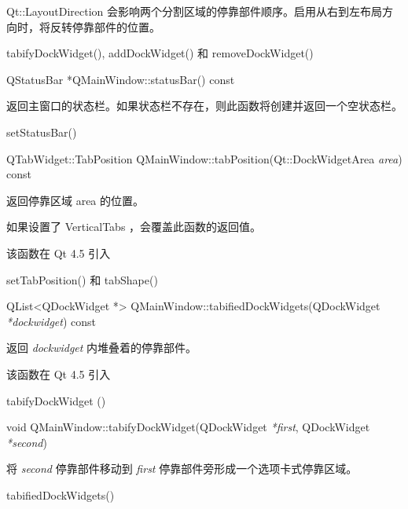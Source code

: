 \begin{notice}
Qt::LayoutDirection 会影响两个分割区域的停靠部件顺序。启用从右到左布局方向时，将反转停靠部件的位置。
\end{notice}


\begin{seeAlso}
tabifyDockWidget(), addDockWidget() 和 removeDockWidget()
\end{seeAlso}

\splitLine

QStatusBar *QMainWindow::statusBar() const

返回主窗口的状态栏。如果状态栏不存在，则此函数将创建并返回一个空状态栏。

\begin{seeAlso}
setStatusBar()
\end{seeAlso}

\splitLine

QTabWidget::TabPosition QMainWindow::tabPosition(Qt::DockWidgetArea \emph{area}) const

返回停靠区域 area 的位置。

\begin{notice}
如果设置了 VerticalTabs ，会覆盖此函数的返回值。
\end{notice}

该函数在 Qt 4.5 引入

\begin{seeAlso}
setTabPosition() 和 tabShape()
\end{seeAlso}

\splitLine

QList<QDockWidget *> QMainWindow::tabifiedDockWidgets(QDockWidget \emph{*dockwidget}) const

返回 \emph{dockwidget} 内堆叠着的停靠部件。

该函数在 Qt 4.5 引入

\begin{seeAlso}
tabifyDockWidget ()
\end{seeAlso}

\splitLine

void QMainWindow::tabifyDockWidget(QDockWidget \emph{*first}, QDockWidget \emph{*second})

将 \emph{second} 停靠部件移动到 \emph{first} 停靠部件旁形成一个选项卡式停靠区域。

\begin{seeAlso}
tabifiedDockWidgets()
\end{seeAlso}

\splitLine

